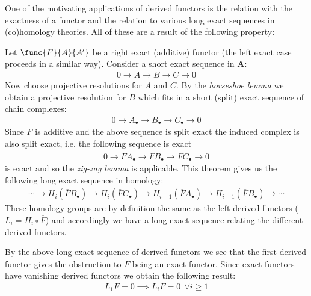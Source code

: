 	One of the motivating applications of derived functors is the relation with the exactness of a functor and the relation to various long exact sequences in (co)homology theories. All of these are a result of the following property:
	\begin{property}
		Let $\func{F}{A}{A'}$ be a right exact (additive) functor (the left exact case proceeds in a similar way). Consider a short exact sequence in $\mathbf{A}$:
		\begin{gather}
			0\longrightarrow A\longrightarrow B\longrightarrow C\longrightarrow 0
		\end{gather}
		Now choose projective resolutions for $A$ and $C$. By the \textit{horseshoe lemma} we obtain a projective resolution for $B$ which fits in a short (split) exact sequence of chain complexes:
		\begin{gather}
			0\longrightarrow A_\bullet\longrightarrow B_\bullet\longrightarrow C_\bullet\longrightarrow 0
		\end{gather}
		Since $F$ is additive and the above sequence is split exact the induced complex is also split exact, i.e. the following sequence is exact
		\begin{gather}
			0\longrightarrow\overline{F}A_\bullet\longrightarrow\overline{F}B_\bullet\longrightarrow\overline{F}C_\bullet\longrightarrow0
		\end{gather}
		is exact and so the \textit{zig-zag lemma} is applicable. This theorem gives us the following long exact sequence in homology:
		\begin{gather}
			\cdots\longrightarrow H_i(\overline{F}B_\bullet)\longrightarrow H_i(\overline{F}C_\bullet) \longrightarrow H_{i-1}(\overline{F}A_\bullet) \longrightarrow H_{i-1}(\overline{F}B_\bullet) \longrightarrow\cdots
		\end{gather}
		These homology groups are by definition the same as the left derived functors ($L_i = H_i\circ\overline{F}$) and accordingly we have a long exact sequence relating the different derived functors.
	\end{property}
	\begin{result}
		By the above long exact sequence of derived functors we see that the first derived functor gives the obstruction to $F$ being an exact functor. Since exact functors have vanishing derived functors we obtain the following result:
		\begin{gather}
			L_1F = 0\implies L_iF=0\ \ \forall i\geq 1
		\end{gather}
	\end{result}

